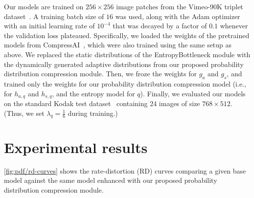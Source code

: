 Our models are trained on $256 \times 256$ image patches from the Vimeo-90K triplet dataset~\cite{xue2019video}.
A training batch size of $16$ was used, along with the Adam optimizer~\cite{kingma2014adam} with an initial learning rate of $10^{-4}$ that was decayed by a factor of $0.1$ whenever the validation loss plateaued.
Specifically, we loaded the weights of the pretrained models from CompressAI~\cite{begaint2020compressai}, which were also trained using the same setup as above.
We replaced the static distributions of the EntropyBottleneck module with the dynamically generated adaptive distributions from our proposed probability distribution compression module.
Then, we froze the weights for $g_a$ and $g_s$, and trained only the weights for our probability distribution compression model (i.e., for $h_{a,q}$ and $h_{s,q}$, and the entropy model for $q$).
Finally, we evaluated our models on the standard Kodak test dataset~\cite{kodak_dataset} containing 24 images of size $768 \times 512$.
(Thus, we set $\lambda_q = \frac{1}{6}$ during training.)


%
%
%




\section{Experimental results}
\label{sec:pdf_compression/experimental_results}

\cref{fig:pdf/rd-curves} shows the rate-distortion (RD) curves comparing a given base model against the same model enhanced with our proposed probability distribution compression module.

